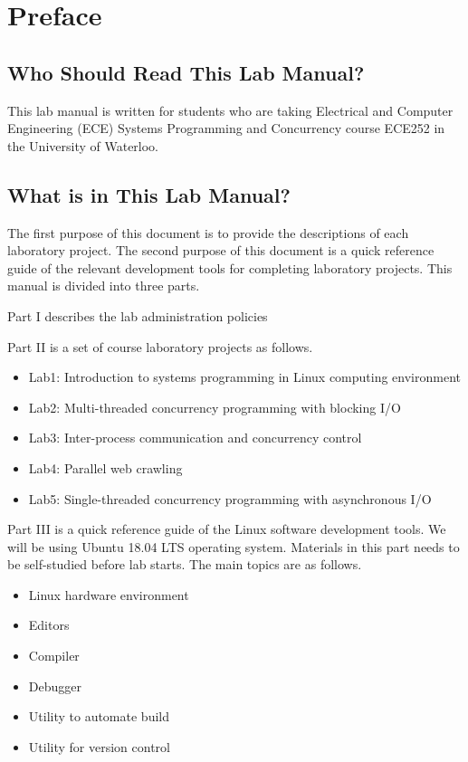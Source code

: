 \frontmatter 



\chapter{Preface}

\section*{Who Should Read This Lab Manual?}
This lab manual is written for students who are taking Electrical and Computer Engineering (ECE) Systems Programming and Concurrency course ECE252 in the University of Waterloo.

\section*{What is in This Lab Manual?}

The first purpose of this document is to provide the descriptions of each laboratory project.
The second purpose of this document is a quick reference guide of the relevant development tools 
for completing laboratory projects. This manual is divided into three parts. 

Part I describes the lab administration policies 

Part II is a set of course laboratory projects as follows.

\begin{itemize}
    \item Lab1: Introduction to systems programming in Linux computing environment
    \item Lab2: Multi-threaded concurrency programming with blocking I/O
    \item Lab3: Inter-process communication and concurrency control
    \item Lab4: Parallel web crawling
    \item Lab5: Single-threaded concurrency programming with asynchronous I/O  
\end{itemize}

Part III is a quick reference guide of the Linux software development tools. We will be using Ubuntu 18.04 LTS operating system. Materials in this part needs to be self-studied before lab starts.
The main topics are as follows.

\begin{itemize}
    \item Linux hardware environment
    \item Editors
    \item Compiler 
    \item Debugger 
    \item Utility to automate build
    \item Utility for version control
\end{itemize}


